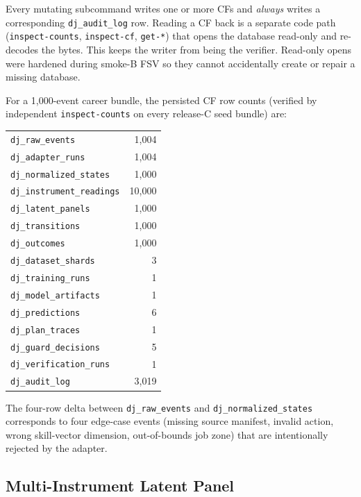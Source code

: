 \documentclass[10pt,twocolumn,letterpaper]{article}
\newcommand{\code}[1]{\texttt{\small #1}}
\begin{document}
Every mutating subcommand writes one or more CFs and \emph{always}
writes a corresponding \code{dj\_audit\_log} row. Reading a CF back
is a separate code path (\code{inspect-counts}, \code{inspect-cf},
\code{get-*}) that opens the database read-only and re-decodes the
bytes. This keeps the writer from being the verifier. Read-only
opens were hardened during smoke-B FSV so they cannot accidentally
create or repair a missing database.

For a 1{,}000-event career bundle, the persisted CF row counts
(verified by independent \code{inspect-counts} on every release-C
seed bundle) are:

\begin{center}\small
\begin{tabular}{lr}
\toprule
\code{dj\_raw\_events} & 1{,}004 \\
\code{dj\_adapter\_runs} & 1{,}004 \\
\code{dj\_normalized\_states} & 1{,}000 \\
\code{dj\_instrument\_readings} & 10{,}000 \\
\code{dj\_latent\_panels} & 1{,}000 \\
\code{dj\_transitions} & 1{,}000 \\
\code{dj\_outcomes} & 1{,}000 \\
\code{dj\_dataset\_shards} & 3 \\
\code{dj\_training\_runs} & 1 \\
\code{dj\_model\_artifacts} & 1 \\
\code{dj\_predictions} & 6 \\
\code{dj\_plan\_traces} & 1 \\
\code{dj\_guard\_decisions} & 5 \\
\code{dj\_verification\_runs} & 1 \\
\code{dj\_audit\_log} & 3{,}019 \\
\bottomrule
\end{tabular}
\end{center}

The four-row delta between \code{dj\_raw\_events} and
\code{dj\_normalized\_states} corresponds to four edge-case events
(missing source manifest, invalid action, wrong skill-vector
dimension, out-of-bounds job zone) that are intentionally rejected
by the adapter.

\subsection{Multi-Instrument Latent Panel}
\end{document}
